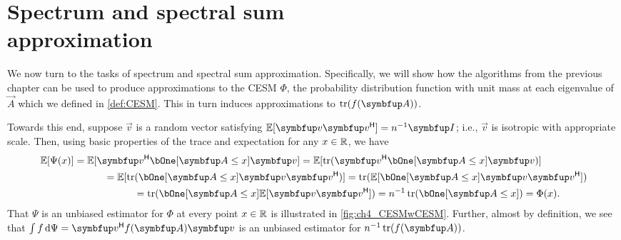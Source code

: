 \chapter{Spectrum and spectral sum\\approximation}
\label{chap:random_quadrature}


We now turn to the tasks of spectrum and spectral sum approximation.
Specifically, we will show how the algorithms from the previous chapter can be used to produce approximations to the CESM \( \Phi \), the probability distribution function with unit mass at each eigenvalue of \( \vec{A} \) which we defined in \cref{def:CESM}.
This in turn induces approximations to \( \tr(\fA) \).

Towards this end, suppose \( \vec{v} \) is a random vector satisfying \( \EE[\vec{v}\vec{v}^\cT] = n^{-1} \vec{I} \); i.e., \( \vec{v} \) is isotropic with appropriate scale.
Then, using basic properties of the trace and expectation for any \( x\in\mathbb{R} \), we have 
\begin{align*}
    \EE[\Psi(x)]
    &= \EE[\vec{v}^\cT \bOne[\vec{A}\leq x] \vec{v}]
    = \EE[\tr (\vec{v}^\cT \bOne[\vec{A}\leq x] \vec{v})] 
    \\& \hspace{3em} = \EE[\tr (\bOne[\vec{A}\leq x] \vec{v} \vec{v}^\cT )]
    = \tr (\EE[ \bOne[\vec{A}\leq x] \vec{v} \vec{v}^\cT ])
    \\& \hspace{6em} = \tr( \bOne[\vec{A}\leq x] \EE[ \vec{v} \vec{v}^\cT ] )
    = n^{-1} \tr(\bOne[\vec{A}\leq x])
    = \Phi(x).
\end{align*}
That \( \Psi \) is an unbiased estimator for \( \Phi \) at every point \( x\in\mathbb{R} \) is illustrated in \cref{fig:ch4_CESMwCESM}.
Further, almost by definition, we see that \( \int f \,\d \Psi = \vec{v}^\cT \fA \vec{v} \) is an unbiased estimator for \( n^{-1} \tr(\fA) \).

